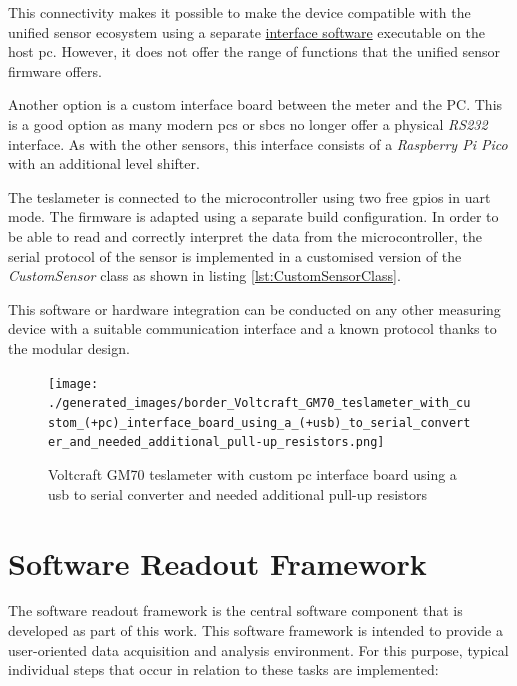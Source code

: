 This connectivity makes it possible to make the device compatible with
the unified sensor ecosystem using a separate
\href{https://github.com/RBEGamer/VoltcraftGM70Rest}{interface software}
executable on the host \gls{pc}. However, it does not offer the range of
functions that the unified sensor firmware offers.

Another option is a custom interface board between the meter and the PC.
This is a good option as many modern \gls{pc}s or \gls{sbc}s no longer
offer a physical \emph{RS232} interface. As with the other sensors, this
interface consists of a \emph{Raspberry Pi Pico} with an additional
level shifter.

The teslameter is connected to the microcontroller using two free
\gls{gpio}s in \gls{uart} mode. The firmware is adapted using a separate
build configuration. In order to be able to read and correctly interpret
the data from the microcontroller, the serial protocol of the sensor is
implemented in a customised version of the \emph{CustomSensor} class as
shown in listing \ref{lst:CustomSensorClass}.

This software or hardware integration can be conducted on any other
measuring device with a suitable communication interface and a known
protocol thanks to the modular design.

\begin{figure}
\centering
\texttt{[image: ./generated\_images/border\_Voltcraft\_GM70\_teslameter\_with\_custom\_(+pc)\_interface\_board\_using\_a\_(+usb)\_to\_serial\_converter\_and\_needed\_additional\_pull-up\_resistors.png]}
\caption{Voltcraft GM70 teslameter with custom \gls{pc} interface board
using a \gls{usb} to serial converter and needed additional pull-up
resistors
\label{Voltcraft_GM70_teslameter_with_custom_(+pc)_interface_board_using_a_(+usb)_to_serial_converter_and_needed_additional_pull-up_resistors.png}}
\end{figure}

\hypertarget{software-readout-framework}{%
\chapter{Software Readout Framework}\label{software-readout-framework}}

The software readout framework is the central software component that is
developed as part of this work. This software framework is intended to
provide a user-oriented data acquisition and analysis environment. For
this purpose, typical individual steps that occur in relation to these
tasks are implemented:

